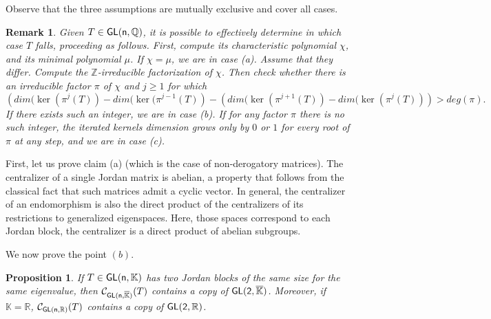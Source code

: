 \documentclass[a4paper,11pt]{article}
\newtheorem{remark}{Remark}[section]
\newtheorem{proposition}{Proposition}[section]
\theoremstyle{definition}
\newcommand{\Q}{\mathbb Q}
\newcommand{\C}{\mathcal C}
\newcommand{\R}{\mathbb R}
\newcommand{\K}{\mathbb K}
\def \GL{\sf{GL}}
\begin{document}
Observe that the three assumptions are mutually exclusive and cover all cases.

\begin{remark}\label{remark4}
Given $T\in \GL(n,\Q)$, it is possible to effectively determine in which case $T$ falls, proceeding as follows. First, compute its characteristic polynomial $\chi$, and its minimal polynomial  $\mu$.    If $\chi = \mu$, we are in case (a). Assume that they differ. Compute the $\mathbb{Z}$-irreducible factorization of $\chi$. Then check whether there is an irreducible factor $\pi$ of $\chi$  and $j \geq 1$  for which     \[\left( dim(\ker(\pi^j(T)) - dim(\ker(\pi^{j-1}(T)\right) - \left( dim(\ker(\pi^{j+1}(T)) - dim(\ker(\pi^{j}(T)) \right) >deg(\pi) .  \] If there exists such an integer,  we are in case (b). If for any factor $\pi$ there is no such integer, the iterated kernels dimension grows only by $0$ or $1$ for every root of $\pi$  at any step, and  we are in case (c).
\end{remark}

First, let us prove claim (a) (which is the case of non-derogatory matrices). The centralizer of a single Jordan matrix is abelian, a property that follows from the classical fact that such matrices admit a cyclic vector. In general, the centralizer of an endomorphism is also the direct product of the centralizers of  its restrictions to generalized eigenspaces. Here, those spaces correspond to each Jordan block, the centralizer is a direct product of abelian subgroups. \newline




We now prove the point $(b)$.

\begin{proposition}\label{prop4}
If $T \in \GL(n,\K)$ has two Jordan blocks of the same size for the same eigenvalue, then $\C_{\GL(n,\overline{\K})}(T)$ contains a copy of $\GL(2,\overline{\K})$. Moreover, if $\K=\R$, $\C_{\GL(n,\R)}(T)$ contains a copy of $\GL(2, \R)$.
\end{proposition}
\end{document}
